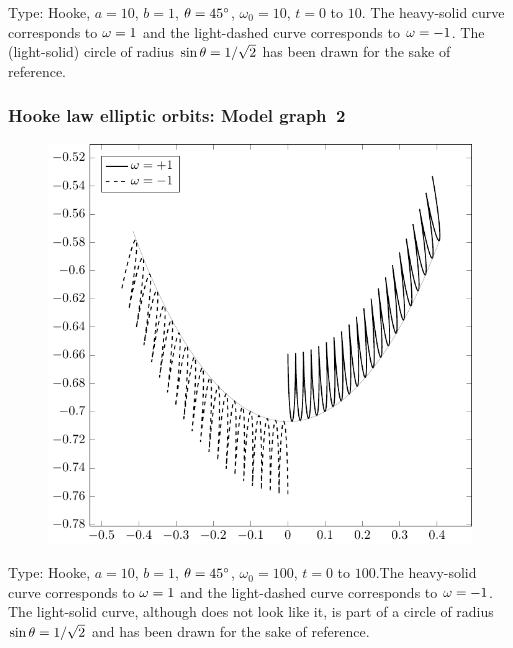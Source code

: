 Type: Hooke, $a = 10 $, $b = 1$, ${\theta} = \ang{45}$, 
$\omega_0 = 10$, $t=0$ to $10$. The heavy-solid 
curve corresponds to ${\omega} = 1$ and the light-dashed curve 
corresponds to ${\omega} = -1$. The (light-solid) circle of 
radius $\sin {\theta} = 1 / \sqrt{2}$ has been drawn for the 
sake of reference.

\newpage

\subsubsection*{Hooke law elliptic orbits: Model graph~2} 
\begin{figure}[H]
\centering
\includegraphics[scale=.4]{src/images/lbk-graphics/larm-h-10-1-45-1-100.pdf}
\caption*{}
\end{figure}

Type: Hooke, $a = 10 $, $b = 1$, ${\theta} = \ang{45}$, 
$\omega_0 = 100$, $t=0$ to $100$.The heavy-solid curve 
corresponds to ${\omega} = 1$ and the light-dashed curve 
corresponds to ${\omega} = -1$. The light-solid curve, although 
does not look like it, is part of a circle of radius $\sin 
{\theta} = 1 / \sqrt{2}$ and has been drawn for the sake of 
reference.

